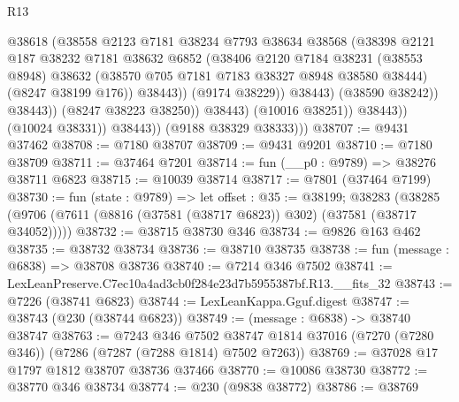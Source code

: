 \begin{lexlean}{R13}
\begin{coremodule}
                                  @38618
                                  (@38558
                                    @2123
                                    @7181
                                    @38234
                                    @7793
                                    @38634
                                    @38568
                                    (@38398
                                      @2121
                                      @187
                                      @38232
                                      @7181
                                      @38632
                                      @6852
                                      (@38406
                                        @2120
                                        @7184
                                        @38231
                                        (@38553 @8948)
                                        @38632
                                        (@38570 @705 @7181 @7183 @38327 @8948 @38580 @38444)
                                        (@8247 @38199 @176))
                                      @38443))
                                  (@9174 @38229))
                                @38443)
                              (@38590 @38242))
                            @38443))
                        (@8247 @38223 @38250))
                      @38443)
                    (@10016 @38251))
                  @38443))
              (@10024 @38331))
            @38443))
        (@9188 @38329 @38333)))
@38707 := @9431 @37462
@38708 := @7180 @38707
@38709 := @9431 @9201
@38710 := @7180 @38709
@38711 := @37464 @7201
@38714 := fun (__p0 : @9789) => @38276 @38711 @6823
@38715 := @10039 @38714
@38717 := @7801 (@37464 @7199)
@38730 := fun (state : @9789) =>
  let offset : @35 := @38199;
  @38283 (@38285 (@9706 (@7611 (@8816 (@37581 (@38717 @6823)) @302) (@37581 (@38717 @34052)))))
@38732 := @38715 @38730 @346
@38734 := @9826 @163 @462
@38735 := @38732 @38734
@38736 := @38710 @38735
@38738 := fun (message : @6838) => @38708 @38736
@38740 := @7214 @346 @7502
@38741 := LexLeanPreserve.C7ec10a4ad3cb0f284e23d7b5955387bf.R13.__fits_32
@38743 := @7226 (@38741 @6823)
@38744 := LexLeanKappa.Gguf.digest
@38747 := @38743 (@230 (@38744 @6823))
@38749 := (message : @6838) -> @38740 @38747
@38763 := @7243
    @346
    @7502
    @38747
    @1814
    @37016
    (@7270 (@7280 @346))
    (@7286 (@7287 (@7288 @1814) @7502 @7263))
@38769 := @37028 @17 @1797 @1812 @38707 @38736 @37466
@38770 := @10086 @38730
@38772 := @38770 @346 @38734
@38774 := @230 (@9838 @38772)
@38786 := @38769

\end{coremodule}
\end{lexlean}
